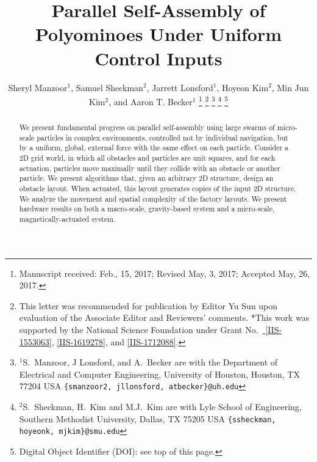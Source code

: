 \documentclass[letterpaper, 10 pt, conference]{ieeeconf}
\begin{document}
\title{Parallel Self-Assembly of Polyominoes Under Uniform Control Inputs}
\author{Sheryl Manzoor$^{1}$, Samuel Sheckman$^{2}$, Jarrett Lonsford$^{1}$, Hoyeon Kim$^{2}$, Min Jun Kim$^{2}$, and Aaron T. Becker$^{1}$%
\thanks{Manuscript received: Feb., 15, 2017; Revised May, 3, 2017; Accepted May, 26, 2017.}%
\thanks{This letter was recommended for publication by Editor Yu Sun upon evaluation of the Associate Editor and Reviewers' comments. *This work was supported by the National Science Foundation under Grant No.\ \href{http://nsf.gov/awardsearch/showAward?AWD_ID=1553063}{ [IIS-1553063]}, \href{http://nsf.gov/awardsearch/showAward?AWD_ID=1619278}{[IIS-1619278]}, and \href{https://nsf.gov/awardsearch/showAward?AWD_ID=1712088}{[IIS-1712088]}.}%
\thanks{$^{1}$S.~Manzoor, J Lonsford, and  A.~Becker are with the Department of Electrical and Computer Engineering,  University of Houston, Houston, TX 77204 USA        {\tt\small  \{smanzoor2, jllonsford, atbecker\}@uh.edu}}%
\thanks{$^{2} $S.~Sheckman, H.~Kim and M.J.~Kim are with Lyle School of Engineering,   Southern Methodist University, Dallas, TX 75205 USA        {\tt\small  \{ssheckman, hoyeonk, mjkim\}@smu.edu}}%
\thanks{Digital Object Identifier (DOI): see top of this page.}
}
\maketitle


\begin{abstract} 
We present fundamental progress on parallel self-assembly using large swarms of micro-scale particles in complex environments, controlled not by individual navigation, but by a uniform, global, external force with the same effect on each particle.
Consider a 2D grid world, in which all obstacles and particles are unit squares,
and for each actuation, particles move maximally until they collide with an obstacle or another particle. 
We present algorithms that, given an arbitrary 2D structure, design an obstacle layout.
 When actuated, this layout generates copies of the input 2D structure.
We analyze the movement and spatial complexity of the factory layouts. 
We present hardware results on both a macro-scale, gravity-based system and a micro-scale, magnetically-actuated system.
\end{abstract}












\end{document}
